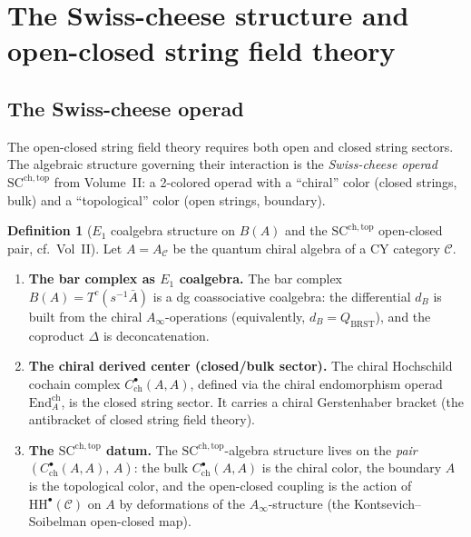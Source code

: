 \documentclass[11pt]{amsart}
\theoremstyle{plain}
\theoremstyle{definition}
\newtheorem{definition}[theorem]{Definition}
\theoremstyle{remark}
\newcommand{\Ainf}{A_\infty}
\newcommand{\HH}{\mathrm{HH}}
\newcommand{\End}{\mathrm{End}}
\newcommand{\BRST}{\mathrm{BRST}}
\newcommand{\SC}{\mathrm{SC}}
\newcommand{\cC}{\mathcal{C}}
\begin{document}
\section{The Swiss-cheese structure and open-closed string field theory}
\label{sec:swiss-cheese}

\subsection{The Swiss-cheese operad}
\label{subsec:sc-operad}

The open-closed string field theory requires both open and closed string sectors. The algebraic structure governing their interaction is the \emph{Swiss-cheese operad} $\SC^{\mathrm{ch,top}}$ from Volume~II: a 2-colored operad with a ``chiral'' color (closed strings, bulk) and a ``topological'' color (open strings, boundary).

\begin{definition}[$E_1$ coalgebra structure on $B(A)$ and the $\SC^{\mathrm{ch,top}}$ open-closed pair, cf.~Vol~II]
\label{def:sc-on-bar}
Let $A = A_\cC$ be the quantum chiral algebra of a CY category $\cC$.
\begin{enumerate}[label=(\roman*)]
 \item \textbf{The bar complex as $E_1$ coalgebra.}
  The bar complex $B(A) = T^c(s^{-1}\bar{A})$ is a dg coassociative coalgebra: the differential $d_B$ is built from the chiral $\Ainf$-operations (equivalently, $d_B = Q_{\BRST}$), and the coproduct $\Delta$ is deconcatenation.
 \item \textbf{The chiral derived center (closed/bulk sector).}
  The chiral Hochschild cochain complex $C^\bullet_{\mathrm{ch}}(A,A)$, defined via the chiral endomorphism operad $\End^{\mathrm{ch}}_A$, is the closed string sector. It carries a chiral Gerstenhaber bracket (the antibracket of closed string field theory).
 \item \textbf{The $\SC^{\mathrm{ch,top}}$ datum.}
  The $\SC^{\mathrm{ch,top}}$-algebra structure lives on the \emph{pair} $(C^\bullet_{\mathrm{ch}}(A,A),\, A)$: the bulk $C^\bullet_{\mathrm{ch}}(A,A)$ is the chiral color, the boundary $A$ is the topological color, and the open-closed coupling is the action of $\HH^\bullet(\cC)$ on $A$ by deformations of the $\Ainf$-structure (the Kontsevich--Soibelman open-closed map).
\end{enumerate}
\end{definition}
\end{document}
